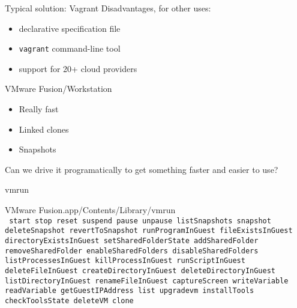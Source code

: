 \documentclass[xcolor=svgnames,17pt]{beamer}
\newcommand*{\sizefont}[1]{%
    \ifcase#1\relax
    \or \tiny
    \or \scriptsize
    \or \footnotesize
    \or \small
    \or \normalsize
    \or \large
    \or \Large
    \or \LARGE
    \or \huge
    \or \Huge
    \fi}
\begin{document}
\begin{frame}{Typical solution: Vagrant}
Disadvantages, for other uses:
\begin{itemize}
\item declarative specification file
\pause
\item \texttt{vagrant} command-line tool
\pause
\item support for 20+ cloud providers
\end{itemize}
\end{frame}

\begin{frame}{VMware Fusion/Workstation}
\begin{itemize}
\item Really fast
\item Linked clones
\item Snapshots
\end{itemize}
\pause
Can we drive it programatically to get something faster and easier to use?
\end{frame}

\begin{frame}{vmrun}

VMware Fusion.app/Contents/Library/vmrun \\[0.25in]

\sizefont 2
\texttt{%
start stop reset suspend pause unpause listSnapshots snapshot
deleteSnapshot revertToSnapshot runProgramInGuest fileExistsInGuest
directoryExistsInGuest setSharedFolderState addSharedFolder
removeSharedFolder enableSharedFolders disableSharedFolders
listProcessesInGuest killProcessInGuest runScriptInGuest deleteFileInGuest
createDirectoryInGuest deleteDirectoryInGuest listDirectoryInGuest
renameFileInGuest captureScreen writeVariable readVariable
getGuestIPAddress list upgradevm installTools checkToolsState
deleteVM clone
}

\end{frame}
\end{document}
